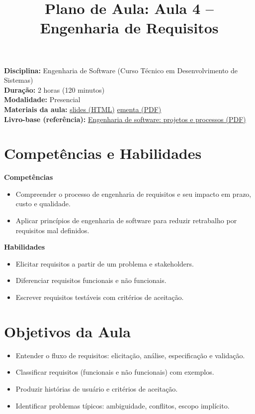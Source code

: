 \documentclass[12pt,a4paper]{article}
\title{Plano de Aula: Aula 4 -- Engenharia de Requisitos}
\date{}
\begin{document}
\maketitle

\noindent
\textbf{Disciplina:} Engenharia de Software (Curso Técnico em Desenvolvimento de Sistemas)\\
\textbf{Duração:} 2 horas (120 minutos)\\
\textbf{Modalidade:} Presencial\\
\textbf{Materiais da aula:} \href{aula-04.html}{slides (HTML)} \quad \href{aula-04.pdf}{ementa (PDF)}\\
\textbf{Livro-base (referência):} \href{../99-Materiais/Engenharia%20de%20software%20projetos%20e%20processos%20by%20Wilson%20de%20P%C3%A1dua%20Paula%20Filho%20.epub.pdf}{Engenharia de software: projetos e processos (PDF)}

\section{Competências e Habilidades}
\textbf{Competências}
\begin{itemize}[leftmargin=*,itemsep=0.25em]
  \item Compreender o processo de engenharia de requisitos e seu impacto em prazo, custo e qualidade.
  \item Aplicar princípios de engenharia de software para reduzir retrabalho por requisitos mal definidos.
\end{itemize}

\textbf{Habilidades}
\begin{itemize}[leftmargin=*,itemsep=0.25em]
  \item Elicitar requisitos a partir de um problema e stakeholders.
  \item Diferenciar requisitos funcionais e não funcionais.
  \item Escrever requisitos testáveis com critérios de aceitação.
\end{itemize}

\section{Objetivos da Aula}
\begin{itemize}[leftmargin=*,itemsep=0.25em]
  \item Entender o fluxo de requisitos: elicitação, análise, especificação e validação.
  \item Classificar requisitos (funcionais e não funcionais) com exemplos.
  \item Produzir histórias de usuário e critérios de aceitação.
  \item Identificar problemas típicos: ambiguidade, conflitos, escopo implícito.
\end{itemize}
\end{document}
